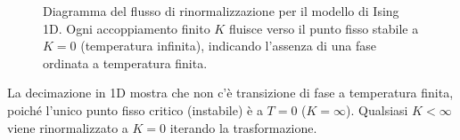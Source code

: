 \begin{figure}[h]
    \centering
    \caption{Diagramma del flusso di rinormalizzazione per il modello di Ising 1D. Ogni accoppiamento finito $K$ fluisce verso il punto fisso stabile a $K=0$ (temperatura infinita), indicando l'assenza di una fase ordinata a temperatura finita.}
    \label{fig:rg_flow}
\end{figure}

La decimazione in 1D mostra che non c'è transizione di fase a temperatura finita, poiché l'unico punto fisso critico (instabile) è a $T=0$ ($K=\infty$). Qualsiasi $K < \infty$ viene rinormalizzato a $K=0$ iterando la trasformazione.
